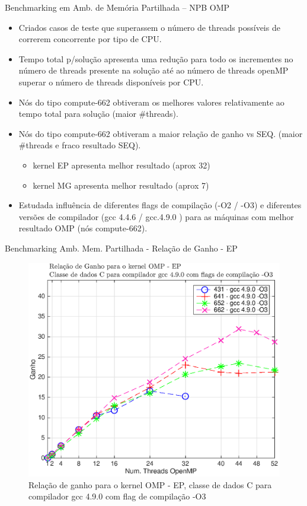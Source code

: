 \documentclass{beamer}
\begin{document}
\begin{frame}{Benchmarking em Amb. de Memória Partilhada  -- NPB OMP}
\begin{itemize}
\item \small Criados casos de teste que superassem o número de threads possíveis de correrem concorrente por tipo de CPU.
\item \small Tempo total p/solução apresenta uma redução para todo os incrementes no número de threads presente na solução até ao número de threads openMP superar o número de threads disponíveis por CPU.
\item \small Nós do tipo compute-662 obtiveram os melhores valores relativamente ao tempo total para solução \tiny{ \color{red} (maior \#threads)}.
\item \small Nós do tipo compute-662 obtiveram a maior relação de ganho vs SEQ. \tiny{ \color{red} (maior \#threads e fraco resultado SEQ)}.
\begin{itemize}
\item kernel EP apresenta melhor resultado (aprox 32)
\item kernel MG apresenta melhor resultado (aprox 7)

\end{itemize}
\item \small Estudada influência de diferentes flags de compilação (-O2 / -O3) e diferentes versões de compilador (gcc 4.4.6 / gcc.4.9.0 ) para as máquinas com melhor resultado OMP (nós compute-662).


 \end{itemize}
  \end{frame}
  
     \begin{frame}{Benchmarking Amb. Mem. Partilhada  - {\small Relação de Ganho - EP}}

\begin{figure}[H]
\centering
\includegraphics[width=0.75\columnwidth]{EPS/OMP/ganho_ep_03.eps}
\caption{\tiny Relação de ganho para o kernel OMP - EP, classe de dados C para  compilador gcc 4.9.0 com flag de compilação -O3}
\label{ganho_omp}
\end{figure}

  \end{frame}
  
\end{document}
